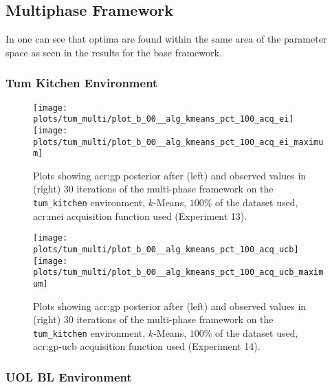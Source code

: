 \newpage

\subsection{Multiphase Framework}
\label{sec:multiphase-framework-results}

In  one can see that optima are found within the same area of the parameter space as seen in the results for the base framework.

\subsubsection{Tum Kitchen Environment}
\blindtext

\begin{figure}[t!]
	\centering
	\texttt{[image: plots/tum\_multi/plot\_b\_00\_\_alg\_kmeans\_pct\_100\_acq\_ei]}
	\texttt{[image: plots/tum\_multi/plot\_b\_00\_\_alg\_kmeans\_pct\_100\_acq\_ei\_maximum]}
	\caption{Plots showing \acrshort{acr:gp} posterior after (left) and observed values in (right) 30 iterations of the multi-phase framework on the \texttt{tum\_kitchen} environment, $k$-Means, $100\%$ of the dataset used, \acrshort{acr:mei} acquisition function used (Experiment 13).}
	\label{fig:exp13}
\end{figure}
\begin{figure}[t!]
	\centering
	\texttt{[image: plots/tum\_multi/plot\_b\_00\_\_alg\_kmeans\_pct\_100\_acq\_ucb]}
	\texttt{[image: plots/tum\_multi/plot\_b\_00\_\_alg\_kmeans\_pct\_100\_acq\_ucb\_maximum]}
	\caption{Plots showing \acrshort{acr:gp} posterior after (left) and observed values in (right) 30 iterations of the multi-phase framework on the \texttt{tum\_kitchen} environment, $k$-Means, $100\%$ of the dataset used, \acrshort{acr:gp-ucb} acquisition function used (Experiment 14).}
	\label{fig:exp14}
\end{figure}%

\newpage

\subsubsection{UOL BL Environment}
\blindtext

